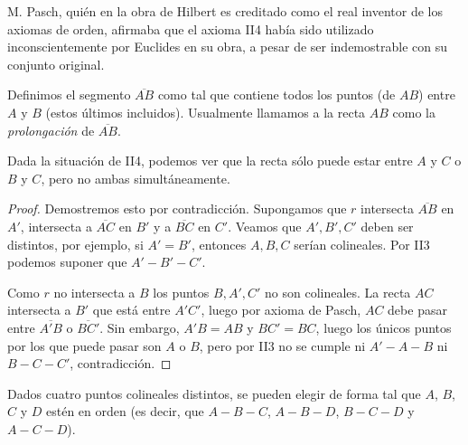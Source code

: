 \documentclass[11pt,a4paper]{book}
\begin{document}
M. Pasch, quién en la obra de Hilbert es creditado como el real inventor de los axiomas de orden, afirmaba que el axioma II4 había sido utilizado inconscientemente por Euclides en su obra, a pesar de ser indemostrable con su conjunto original.
\begin{mydef}[Segmento]
Definimos el segmento $\overline{AB}$ como tal que contiene todos los puntos (de $AB$) entre $A$ y $B$ (estos últimos incluidos). Usualmente llamamos a la recta $AB$ como la \textit{prolongación} de $\overline{AB}$.
\end{mydef}
\begin{thm}
Dada la situación de II4, podemos ver que la recta sólo puede estar entre $A$ y $C$ o $B$ y $C$, pero no ambas simultáneamente.
\end{thm}
\begin{proof}
Demostremos esto por contradicción. Supongamos que $r$ intersecta $\overline{AB}$ en $A'$, intersecta a $\overline{AC}$ en $B'$ y a $\overline{BC}$ en $C'$. Veamos que $A',B',C'$ deben ser distintos, por ejemplo, si $A'=B'$, entonces $A,B,C$ serían colineales. Por II3 podemos suponer que $A'-B'-C'$.

Como $r$ no intersecta a $B$ los puntos $B,A',C'$ no son colineales. La recta $AC$ intersecta a $B'$ que está entre $A'C'$, luego por axioma de Pasch, $AC$ debe pasar entre $\overline{A'B}$ o $\overline{BC'}$. Sin embargo, $A'B=AB$ y $BC'=BC$, luego los únicos puntos por los que puede pasar son $A$ o $B$, pero por II3 no se cumple ni $A'-A-B$ ni $B-C-C'$, contradicción.
\end{proof}
\begin{thm}
Dados cuatro puntos colineales distintos, se pueden elegir de forma tal que $A$, $B$, $C$ y $D$ estén en orden (es decir, que $A-B-C$, $A-B-D$, $B-C-D$ y $A-C-D$).
\end{thm}
\end{document}
